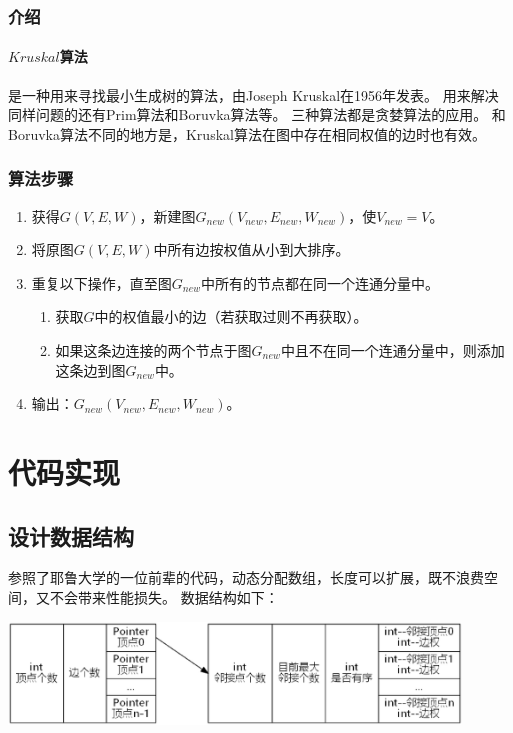 \documentclass[a4paper,10pt]{ctexart}
\begin{document}
\subsubsection{介绍}
\paragraph{$Kruskal$算法}是一种用来寻找最小生成树的算法，由Joseph Kruskal在1956年发表。
用来解决同样问题的还有Prim算法和Boruvka算法等。
三种算法都是贪婪算法的应用。
和Boruvka算法不同的地方是，Kruskal算法在图中存在相同权值的边时也有效。
\subsubsection{算法步骤}
\begin{enumerate}
  \item 获得$G(V,E,W)$，新建图$G_{new}(V_{new},E_{new},W_{new})$，使$V_{new} = V$。
  \item 将原图$G(V,E,W)$中所有边按权值从小到大排序。
  \item 重复以下操作，直至图$G_{new}$中所有的节点都在同一个连通分量中。
      \begin{enumerate}
       \item 获取$G$中的权值最小的边（若获取过则不再获取）。
       \item 如果这条边连接的两个节点于图$G_{new}$中且不在同一个连通分量中，则添加这条边到图$G_{new}$中。
      \end{enumerate}
  \item 输出：$G_{new}(V_{new},E_{new},W_{new})$。
\end{enumerate}


\section{代码实现}
\subsection{设计数据结构}
参照了耶鲁大学的一位前辈的代码，动态分配数组，长度可以扩展，既不浪费空间，又不会带来性能损失。
数据结构如下：

\includegraphics[width=0.9\textwidth]{../Pics/DataStruct.eps}
\end{document}

